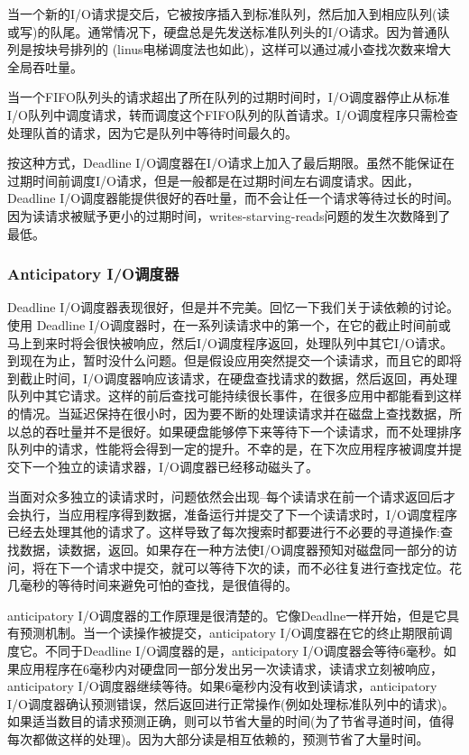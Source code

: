 当一个新的I/O请求提交后，它被按序插入到标准队列，然后加入到相应队列(读或写)的队尾。通常情况下，硬盘总是先发送标准队列头的I/O请求。因为普通队列是按块号排列的 (linus电梯调度法也如此)，这样可以通过减小查找次数来增大全局吞吐量。

当一个FIFO队列头的请求超出了所在队列的过期时间时，I/O调度器停止从标准I/O队列中调度请求，转而调度这个FIFO队列的队首请求。I/O调度程序只需检查处理队首的请求，因为它是队列中等待时间最久的。

按这种方式，Deadline I/O调度器在I/O请求上加入了最后期限。虽然不能保证在过期时间前调度I/O请求，但是一般都是在过期时间左右调度请求。因此，Deadline I/O调度器能提供很好的吞吐量，而不会让任一个请求等待过长的时间。因为读请求被赋予更小的过期时间，writes-starving-reads问题的发生次数降到了最低。

\subsubsection{Anticipatory I/O调度器}

Deadline I/O调度器表现很好，但是并不完美。回忆一下我们关于读依赖的讨论。使用 Deadline I/O调度器时，在一系列读请求中的第一个，在它的截止时间前或马上到来时将会很快被响应，然后I/O调度程序返回，处理队列中其它I/O请求。到现在为止，暂时没什么问题。但是假设应用突然提交一个读请求，而且它的即将到截止时间，I/O调度器响应该请求，在硬盘查找请求的数据，然后返回，再处理队列中其它请求。这样的前后查找可能持续很长事件，在很多应用中都能看到这样的情况。当延迟保持在很小时，因为要不断的处理读请求并在磁盘上查找数据，所以总的吞吐量并不是很好。如果硬盘能够停下来等待下一个读请求，而不处理排序队列中的请求，性能将会得到一定的提升。不幸的是，在下次应用程序被调度并提交下一个独立的读请求器，I/O调度器已经移动磁头了。
     
当面对众多独立的读请求时，问题依然会出现--每个读请求在前一个请求返回后才会执行，当应用程序得到数据，准备运行并提交了下一个读请求时，I/O调度程序已经去处理其他的请求了。这样导致了每次搜索时都要进行不必要的寻道操作:查找数据，读数据，返回。如果存在一种方法使I/O调度器预知对磁盘同一部分的访问，将在下一个请求中提交，就可以等待下次的读，而不必往复进行查找定位。花几毫秒的等待时间来避免可怕的查找，是很值得的。
     
anticipatory I/O调度器的工作原理是很清楚的。它像Deadlne一样开始，但是它具有预测机制。当一个读操作被提交，anticipatory I/O调度器在它的终止期限前调度它。不同于Deadline I/O调度器的是，anticipatory I/O调度器会等待6毫秒。如果应用程序在6毫秒内对硬盘同一部分发出另一次读请求，读请求立刻被响应，anticipatory I/O调度器继续等待。如果6毫秒内没有收到读请求，anticipatory I/O调度器确认预测错误，然后返回进行正常操作(例如处理标准队列中的请求)。如果适当数目的请求预测正确，则可以节省大量的时间(为了节省寻道时间，值得每次都做这样的处理)。因为大部分读是相互依赖的，预测节省了大量时间。

